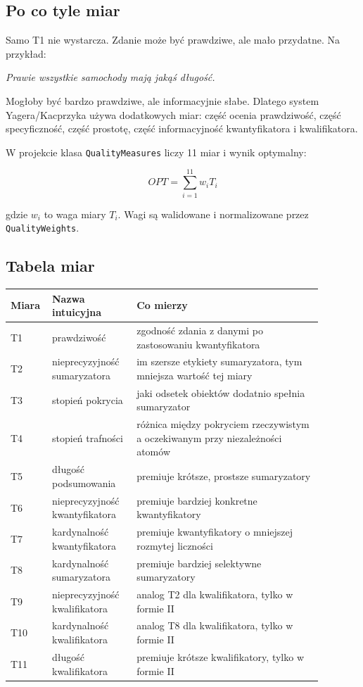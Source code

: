 \documentclass[11pt,a4paper]{article}
\newcommand{\code}[1]{\texttt{#1}}
\begin{document}
\subsection{Po co tyle miar}

Samo T1 nie wystarcza. Zdanie może być prawdziwe, ale mało przydatne. Na przykład:

\begin{center}
\emph{Prawie wszystkie samochody mają jakąś długość.}
\end{center}

Mogłoby być bardzo prawdziwe, ale informacyjnie słabe. Dlatego system Yagera/Kacprzyka używa dodatkowych miar: część ocenia prawdziwość, część specyficzność, część prostotę, część informacyjność kwantyfikatora i kwalifikatora.

W projekcie klasa \code{QualityMeasures} liczy 11 miar i wynik optymalny:

\[
OPT = \sum_{i=1}^{11} w_i T_i
\]

gdzie \(w_i\) to waga miary \(T_i\). Wagi są walidowane i normalizowane przez \code{QualityWeights}.

\subsection{Tabela miar}

\begin{longtable}{p{0.08\linewidth}p{0.25\linewidth}p{0.55\linewidth}}
\toprule
\textbf{Miara} & \textbf{Nazwa intuicyjna} & \textbf{Co mierzy}\\
\midrule
\endhead
T1 & prawdziwość & zgodność zdania z danymi po zastosowaniu kwantyfikatora\\
T2 & nieprecyzyjność sumaryzatora & im szersze etykiety sumaryzatora, tym mniejsza wartość tej miary\\
T3 & stopień pokrycia & jaki odsetek obiektów dodatnio spełnia sumaryzator\\
T4 & stopień trafności & różnica między pokryciem rzeczywistym a oczekiwanym przy niezależności atomów\\
T5 & długość podsumowania & premiuje krótsze, prostsze sumaryzatory\\
T6 & nieprecyzyjność kwantyfikatora & premiuje bardziej konkretne kwantyfikatory\\
T7 & kardynalność kwantyfikatora & premiuje kwantyfikatory o mniejszej rozmytej liczności\\
T8 & kardynalność sumaryzatora & premiuje bardziej selektywne sumaryzatory\\
T9 & nieprecyzyjność kwalifikatora & analog T2 dla kwalifikatora, tylko w formie II\\
T10 & kardynalność kwalifikatora & analog T8 dla kwalifikatora, tylko w formie II\\
T11 & długość kwalifikatora & premiuje krótsze kwalifikatory, tylko w formie II\\
\bottomrule
\end{longtable}
\end{document}
